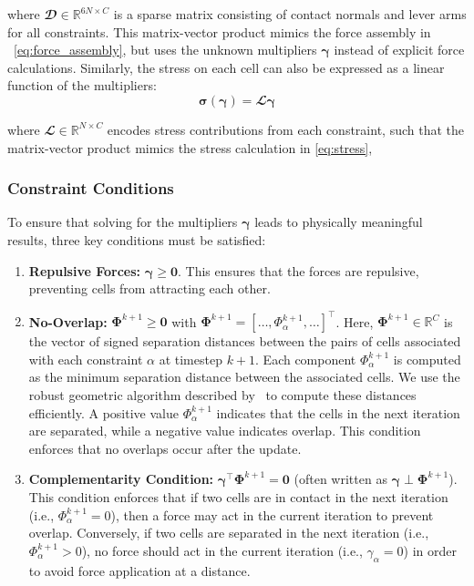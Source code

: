 \documentclass[conference]{IEEEtran}
\begin{document}
where $\mathbfcal{D} \in \mathbb{R}^{6N \times C}$ is a sparse matrix consisting of contact normals and lever arms for all constraints. This matrix-vector product mimics the force assembly in ~\autoref{eq:force_assembly}, but uses the unknown multipliers $\boldsymbol{\gamma}$ instead of explicit force calculations. Similarly, the stress on each cell can also be expressed as a linear function of the multipliers:
\begin{equation} \label{eq:stress_as_function_of_multipliers}
    \boldsymbol{\sigma}(\boldsymbol{\gamma}) = \mathbfcal{L} \boldsymbol{\gamma}
\end{equation}

where $\mathbfcal{L} \in \mathbb{R}^{N \times C}$ encodes stress contributions from each constraint, such that the matrix-vector product mimics the stress calculation in \autoref{eq:stress},

\subsubsection{Constraint Conditions}

To ensure that solving for the multipliers $\boldsymbol{\gamma}$ leads to physically meaningful results, three key conditions must be satisfied:


\begin{enumerate}
    \item \textbf{Repulsive Forces:} $\boldsymbol{\gamma} \geq \mathbf{0}$. This ensures that the forces are repulsive, preventing cells from attracting each other.
    \item \textbf{No-Overlap:} $\mathbf{\Phi}^{k+1} \geq \mathbf{0}$ with $\mathbf{\Phi}^{k+1} = [\dots, \Phi_\alpha^{k+1}, \dots]^\top$. Here, $\mathbf{\Phi}^{k+1} \in \mathbb{R}^{C}$ is the vector of signed separation distances between the pairs of cells associated with each constraint $\alpha$ at timestep $k+1$. Each component $\Phi_\alpha^{k+1}$ is computed as the minimum separation distance between the associated cells. We use the robust geometric algorithm described by~\cite{Yan2019, GeometricTools} to compute these distances efficiently.
          A positive value $\Phi_\alpha^{k+1}$ indicates that the cells in the next iteration are separated, while a negative value indicates overlap. This condition enforces that no overlaps occur after the update.
    \item \textbf{Complementarity Condition:}  $\boldsymbol{\gamma}^\top \mathbf{\Phi}^{k+1} = \mathbf{0}$ (often written as $\boldsymbol{\gamma} \perp \mathbf{\Phi}^{k+1}$). This condition enforces that if two cells are in contact in the next iteration (i.e., $\Phi_\alpha^{k+1} = 0$), then a force may act in the current iteration to prevent overlap.
          Conversely, if two cells are separated in the next iteration (i.e., $\Phi_\alpha^{k+1} > 0$), no force should act in the current iteration (i.e., $\gamma_\alpha = 0$) in order to avoid force application at a distance.
\end{enumerate}
\end{document}
